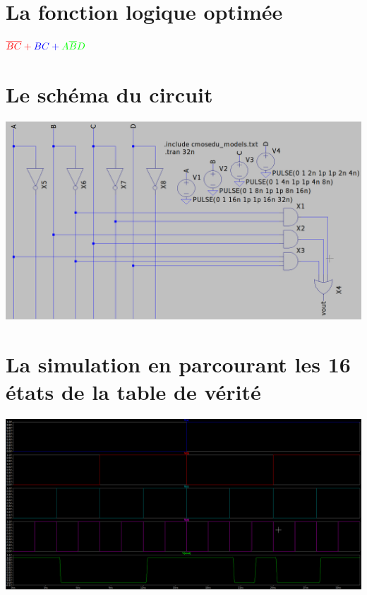 \documentclass{homeworg}
\begin{document}
\section{La fonction logique optimée}
\begin{center}
    \Huge
    $
    \color{red} \overline{B} \overline{C} +
    \color{blue} BC +
    \color{green} A \overline{B} D
    $
\end{center}

\section{Le schéma du circuit}
\begin{center}
    \includegraphics[scale=0.41]{circuit.png}
\end{center}
\newpage

\section{La simulation en parcourant les 16 états de la table de vérité}
\begin{center}
    \includegraphics[scale=0.31]{truth.png}
\end{center}
\end{document}
